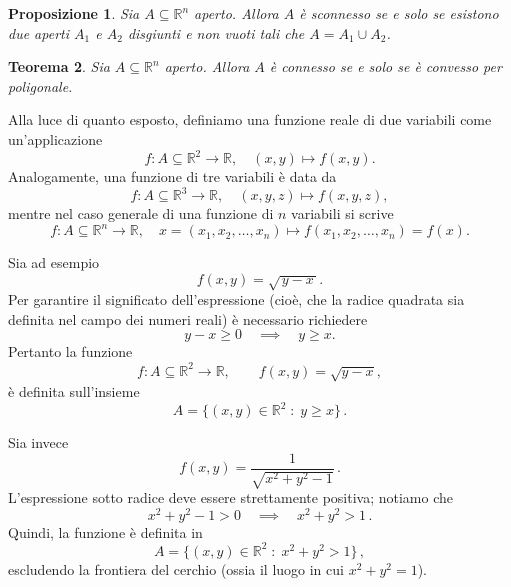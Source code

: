 \documentclass{article}
\theoremstyle{plain}
\newtheorem{thm}{Teorema}[section]
\newtheorem{prop}[thm]{Proposizione}
\theoremstyle{definition}
\theoremstyle{remark}
\begin{document}
\vspace{10pt}

\begin{bxthm}
\begin{prop}
   Sia $A\subseteq\mathbb{R}^n$ aperto.
   Allora $A$ è sconnesso se e solo se esistono due aperti $A_1$ e $A_2$ disgiunti e non vuoti tali che $A=A_1\cup A_2$.
\end{prop}
\end{bxthm}

\vspace{10pt}

\begin{bxthm}
\begin{thm}
    Sia $A\subseteq\mathbb{R}^n$ aperto.
    Allora $A$ è connesso se e solo se è convesso per poligonale.
\end{thm}
\end{bxthm}

\vspace{10pt}

Alla luce di quanto esposto, definiamo una funzione reale di due variabili come un'applicazione
\[
f: A \subseteq \mathbb{R}^2 \to \mathbb{R},\quad (x, y) \mapsto f(x, y).
\]
Analogamente, una funzione di tre variabili è data da
\[
f: A \subseteq \mathbb{R}^3 \to \mathbb{R},\quad (x, y, z) \mapsto f(x, y, z),
\]
mentre nel caso generale di una funzione di $n$ variabili si scrive
\[
f: A \subseteq \mathbb{R}^n \to \mathbb{R},\quad x = (x_1, x_2, \dots, x_n) \mapsto f(x_1, x_2, \dots, x_n) = f(x).
\]

\vspace{10pt}


Sia ad esempio 
\[
f(x,y)=\sqrt{\,y-x\,}.
\]
Per garantire il significato dell'espressione (cioè, che la radice quadrata sia definita nel campo dei numeri reali) è necessario richiedere
\[
y-x\ge 0 \quad\implies\quad y\ge x.
\]
Pertanto la funzione 
\[
f \colon A \subseteq \mathbb{R}^2 \to \mathbb{R}, \qquad f(x,y)=\sqrt{y-x},
\]
è definita sull'insieme
\[
A=\{(x,y)\in\mathbb{R}^2 \;:\; y\ge x\}\,.
\]

Sia invece 
\[
f(x,y)=\frac{1}{\sqrt{x^2+y^2-1}}\,.
\]
L'espressione sotto radice deve essere strettamente positiva; notiamo che
\[
x^2+y^2-1>0 \quad\implies\quad x^2+y^2>1\,.
\]
Quindi, la funzione è definita in
\[
A=\{(x,y)\in\mathbb{R}^2 \;:\; x^2+y^2>1\}\,,
\]
escludendo la frontiera del cerchio (ossia il luogo in cui \(x^2+y^2=1\)).
\end{document}
